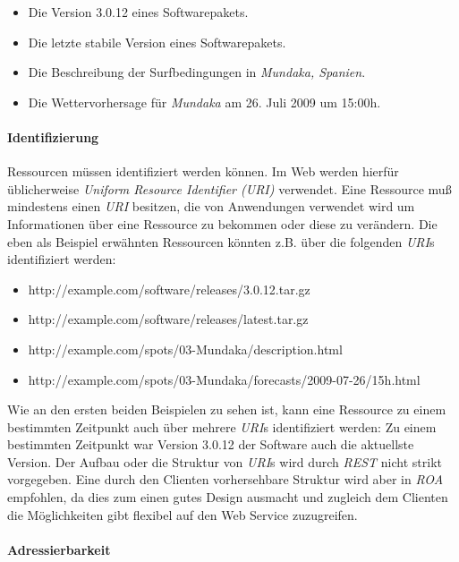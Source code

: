 \begin{itemize}
\item Die Version 3.0.12 eines Softwarepakets.
\item Die letzte stabile Version eines Softwarepakets.
\item Die Beschreibung der Surfbedingungen in \textit{Mundaka,
    Spanien}.
\item Die Wettervorhersage für \textit{Mundaka} am 26. Juli 2009 um 15:00h.
\end{itemize}

\paragraph{Identifizierung}
\label{paragraph:identifizierung}
Ressourcen müssen identifiziert werden können. Im Web werden hierfür
üblicherweise \textit{Uniform Resource Identifier (URI)}
 verwendet. Eine
Ressource muß mindestens einen \textit{URI} besitzen, die von
Anwendungen verwendet wird um Informationen über eine Ressource zu
bekommen oder diese zu verändern. Die eben als Beispiel erwähnten
Ressourcen könnten z.B. über die folgenden \textit{URI}s identifiziert
werden:

{\sf \small
  \begin{itemize}
  \item http://example.com/software/releases/3.0.12.tar.gz
  \item http://example.com/software/releases/latest.tar.gz
  \item http://example.com/spots/03-Mundaka/description.html
  \item http://example.com/spots/03-Mundaka/forecasts/2009-07-26/15h.html
  \end{itemize}
}

Wie an den ersten beiden Beispielen zu sehen ist, kann eine Ressource
zu einem bestimmten Zeitpunkt auch über mehrere \textit{URI}s
identifiziert werden: Zu einem bestimmten Zeitpunkt war Version 3.0.12
der Software auch die aktuellste Version. Der Aufbau oder die Struktur
von \textit{URI}s wird durch \textit{REST} nicht strikt vorgegeben.
Eine durch den Clienten vorhersehbare Struktur wird aber in
\textit{ROA} empfohlen, da dies zum einen gutes Design ausmacht und
zugleich dem Clienten die Möglichkeiten gibt flexibel auf den Web
Service zuzugreifen.

\paragraph{Adressierbarkeit}

